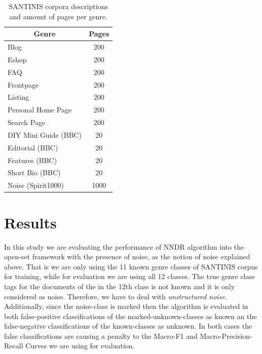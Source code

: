 \documentclass[runningheads]{llncs}
\begin{document}
\begin{table}
\center
\begin{tabular}{|l|l|}
\hline
\multicolumn{1}{|c|}{Genre} & \multicolumn{1}{c|}{Pages} \\
\hline
\multicolumn{1}{|l|}{Blog} & \multicolumn{1}{c|}{200}  \\
\multicolumn{1}{|l|}{Eshop} & \multicolumn{1}{c|}{200} \\
\multicolumn{1}{|l|}{FAQ} & \multicolumn{1}{c|}{200} \\
\multicolumn{1}{|l|}{Frontpage} & \multicolumn{1}{c|}{200} \\
\multicolumn{1}{|l|}{Listing} & \multicolumn{1}{c|}{200} \\
\multicolumn{1}{|l|}{Personal Home Page} & \multicolumn{1}{c|}{200} \\
\multicolumn{1}{|l|}{Search Page} & \multicolumn{1}{c|}{200} \\
\multicolumn{1}{|l|}{DIY Mini Guide (BBC)} & \multicolumn{1}{c|}{20} \\
\multicolumn{1}{|l|}{Editorial (BBC)} & \multicolumn{1}{c|}{20} \\
\multicolumn{1}{|l|}{Features (BBC)} & \multicolumn{1}{c|}{20} \\
\multicolumn{1}{|l|}{Short Bio (BBC)} & \multicolumn{1}{c|}{20} \\
\multicolumn{1}{|l|}{Noise (Spirit1000)} & \multicolumn{1}{c|}{1000}  \\
\hline
\end{tabular}
\caption {SANTINIS corpora descriptions and amount of pages per genre.}
\label{tbl:genre_tags}
\end{table}


\section{Results}\label{sec:Experiments_Results}

In this study we are evaluating the performance of NNDR algorithm into the open-set framework with the presence of noise, as the notion of noise explained above. That is we are only using the 11 known genre classes of SANTINIS corpus for training, while for evaluation we are using all 12 classes. The true genre class tags for the documents of the in the 12th class is not known and it is only considered as noise. Therefore, we have to deal with \textit{unstructured noise}. Additionally, since the noise-class is marked then the algorithm is evaluated in both false-positive classifications of the marked-unknown-classes as known an the false-negative classifications of the known-classes as unknown. In both cases the false classifications are causing a penalty to the Macro-F1 and Macro-Precision-Recall Curves we are using for evaluation.
\end{document}
